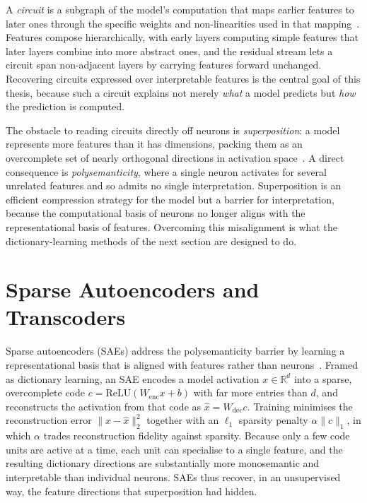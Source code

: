 \documentclass[../main.tex]{subfiles}
\begin{document}
A \emph{circuit} is a subgraph of the model's computation that maps earlier features to later ones through the specific weights and non-linearities used in that mapping~\cite{olah2020zoom}. Features compose hierarchically, with early layers computing simple features that later layers combine into more abstract ones, and the residual stream lets a circuit span non-adjacent layers by carrying features forward unchanged. Recovering circuits expressed over interpretable features is the central goal of this thesis, because such a circuit explains not merely \emph{what} a model predicts but \emph{how} the prediction is computed.

The obstacle to reading circuits directly off neurons is \emph{superposition}: a model represents more features than it has dimensions, packing them as an overcomplete set of nearly orthogonal directions in activation space~\cite{elhage2022superposition}. A direct consequence is \emph{polysemanticity}, where a single neuron activates for several unrelated features and so admits no single interpretation. Superposition is an efficient compression strategy for the model but a barrier for interpretation, because the computational basis of neurons no longer aligns with the representational basis of features. Overcoming this misalignment is what the dictionary-learning methods of the next section are designed to do.
\section{Sparse Autoencoders and Transcoders}
\label{sec:sae-transcoder}
Sparse autoencoders (SAEs) address the polysemanticity barrier by learning a representational basis that is aligned with features rather than neurons~\cite{cunningham2023sparse}. Framed as dictionary learning, an SAE encodes a model activation $x \in \mathbb{R}^{d}$ into a sparse, overcomplete code $c = \mathrm{ReLU}(W_{\mathrm{enc}} x + b)$ with far more entries than $d$, and reconstructs the activation from that code as $\hat{x} = W_{\mathrm{dec}} c$. Training minimises the reconstruction error $\lVert x - \hat{x} \rVert_2^2$ together with an $\ell_1$ sparsity penalty $\alpha \lVert c \rVert_1$, in which $\alpha$ trades reconstruction fidelity against sparsity. Because only a few code units are active at a time, each unit can specialise to a single feature, and the resulting dictionary directions are substantially more monosemantic and interpretable than individual neurons. SAEs thus recover, in an unsupervised way, the feature directions that superposition had hidden.
\end{document}
